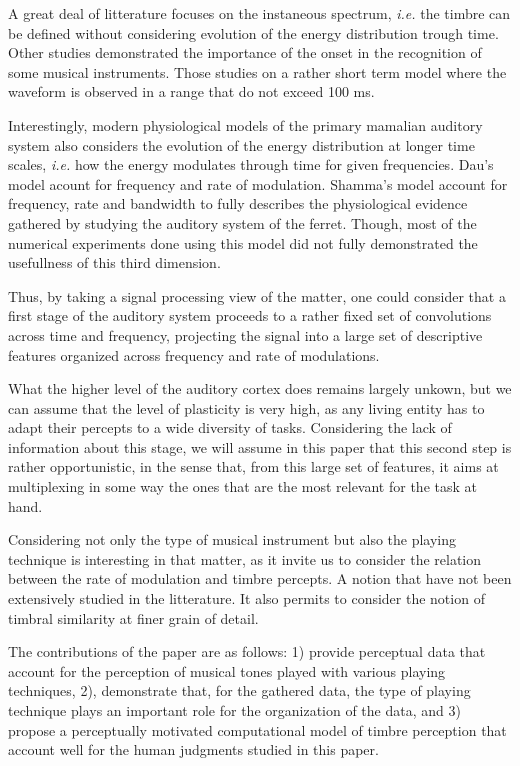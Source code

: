 \documentclass{article}
\begin{document}
A great deal of litterature focuses on the instaneous spectrum, \textit{i.e.} the timbre can be defined without considering evolution of the energy distribution trough time. Other studies demonstrated the importance of the onset in the recognition of some musical instruments. Those studies on a rather short term model where the waveform is observed in a range that do not exceed 100 ms.

Interestingly, modern physiological models of the primary mamalian auditory system also considers the evolution of the energy distribution at longer time scales, \textit{i.e.} how the energy modulates through time for given frequencies.  Dau's model acount for frequency and rate of modulation. Shamma's model account for frequency, rate and bandwidth to fully describes the physiological evidence gathered by studying the auditory system of the ferret. Though, most of the numerical experiments done using this model did not fully demonstrated the usefullness of this third dimension.

Thus, by taking a signal processing view of the matter, one could consider that a first stage of the auditory system proceeds to a rather fixed set of convolutions across time and frequency, projecting the signal into a large set of descriptive features organized across frequency and rate of modulations.

What the higher level of the auditory cortex does remains largely unkown, but we can assume that the level of plasticity is very high, as any living entity has to adapt their percepts to a wide diversity of tasks.  Considering the lack of information about this stage, we will assume in this paper that this second step is rather opportunistic, in the sense that, from this large set of features, it aims at multiplexing in some way the ones that are the most relevant for the task at hand.

Considering not only the type of musical instrument but also the playing technique is interesting in that matter, as it invite us to consider the relation between the rate of modulation and timbre percepts. A notion that have not been extensively studied in the litterature. It also permits to consider the notion of timbral similarity at finer grain of detail.

The contributions of the paper are as follows: 1) provide perceptual data that account for the perception of musical tones played with various playing techniques, 2), demonstrate that, for the gathered data, the type of playing technique plays an important role for the organization of the data, and 3) propose a perceptually motivated computational model of timbre perception that account well for the human judgments studied in this paper.
\end{document}
